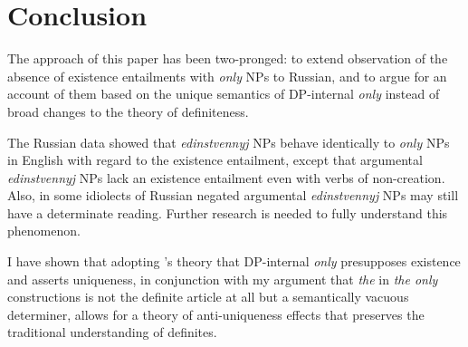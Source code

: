 \section{Conclusion \label{sec:conclusion}}
The approach of this paper has been two-pronged: to extend  observation of the absence of existence entailments with \textit{only} NPs to Russian, and to argue for an account of them based on the unique semantics of DP-internal \textit{only} instead of broad changes to the theory of definiteness.

The Russian data showed that \textit{edinstvennyj} NPs behave identically to \textit{only} NPs in English with regard to the existence entailment, except that argumental \textit{edinstvennyj} NPs lack an existence entailment even with verbs of non-creation. Also, in some idiolects of Russian negated argumental \textit{edinstvennyj} NPs may still have a determinate reading. Further research is needed to fully understand this phenomenon.

I have shown that adopting \citeauthor{cb2015}'s theory that DP-internal \textit{only} presupposes existence and asserts uniqueness, in conjunction with my argument that \textit{the} in \textit{the only} constructions is not the definite article at all but a semantically vacuous determiner, allows for a theory of anti-uniqueness effects that preserves the traditional understanding of definites.

